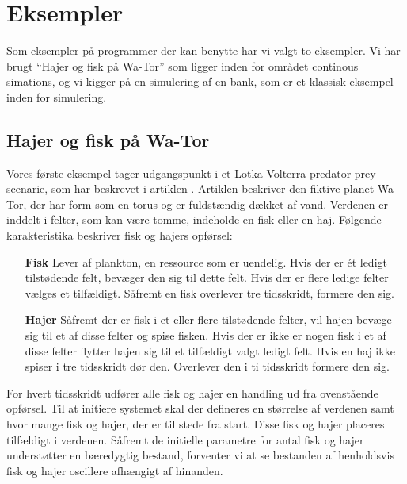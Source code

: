 \section{Eksempler}\label{sec:des-examples}
Som eksempler på programmer der kan benytte \des har vi valgt to eksempler. Vi har brugt ``Hajer og fisk på Wa-Tor'' som ligger inden for området continous simations, og vi kigger på en simulering af en bank, som er et klassisk eksempel inden for simulering. 

\subsection{Hajer og fisk på Wa-Tor} 
Vores første eksempel tager  udgangspunkt i et Lotka-Volterra predator-prey scenarie, som \citeauthor{wator}
har beskrevet i artiklen \cite{wator}. Artiklen beskriver den
fiktive planet Wa-Tor, der har form som en torus og er fuldstændig
dækket af vand. Verdenen er inddelt i felter, som kan være tomme, indeholde en
fisk eller en haj\cite[20]{wator}. Følgende karakteristika beskriver fisk og hajers
opførsel:

\begin{itemize}
\item[\textbf{Fisk}]
Lever af plankton, en ressource som er uendelig. Hvis der er ét ledigt 
tilstødende felt, bevæger den sig til dette felt. Hvis der er flere ledige 
felter vælges et tilfældigt. Såfremt en fisk overlever tre tidsskridt, formere 
den sig.
\item[\textbf{Hajer}]
Såfremt der er fisk i et eller flere tilstødende felter, vil hajen bevæge sig 
til et af disse felter og spise fisken. Hvis der er ikke er nogen fisk i et af 
disse felter flytter hajen sig til et tilfældigt valgt ledigt felt. Hvis en haj 
ikke spiser i tre tidsskridt dør den. Overlever den i ti tidsskridt formere 
den sig.
\end{itemize}

For hvert tidsskridt udfører alle fisk og hajer en handling ud fra
ovenstående opførsel.
Til at initiere systemet skal der defineres en størrelse af verdenen
samt hvor mange fisk og hajer, der er til stede fra start. Disse fisk og
hajer placeres tilfældigt i verdenen.
Såfremt de initielle parametre for antal fisk og hajer understøtter en 
bæredygtig bestand, forventer vi at se bestanden af henholdsvis fisk og hajer 
oscillere afhængigt af hinanden.

